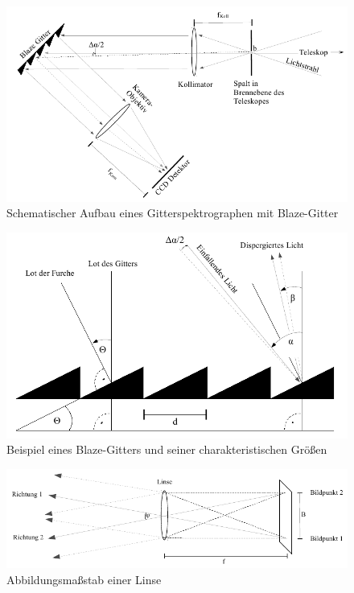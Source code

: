 \begin{figure}
		\includegraphics[width=.9\textwidth]{images/Abbildung101}
\caption{ Schematischer Aufbau eines Gitterspektrographen mit Blaze-Gitter }
\label{fig:101}
\end{figure}
\begin{figure}

        \includegraphics[width=.9\textwidth]{images/Abbildung102.png}
\caption{ Beispiel eines Blaze-Gitters und seiner charakteristischen Größen }
\label{fig:102}
\end{figure}
\begin{figure}

        \includegraphics[width=.9\textwidth]{images/Abbildung103.png}
\caption{ Abbildungsmaßstab einer Linse }
\label{fig:103}
\end{figure}

